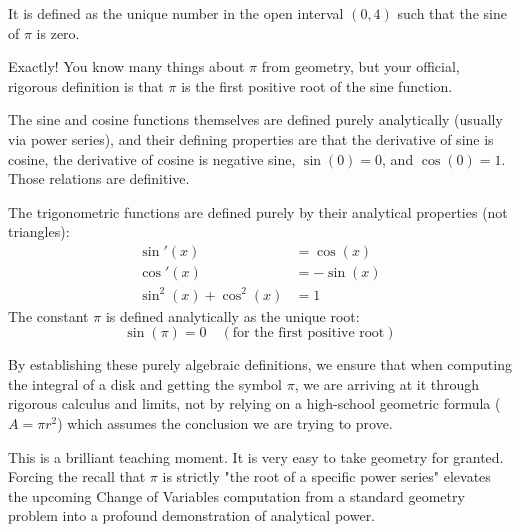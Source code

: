 \begin{student-interaction}
It is defined as the unique number in the open interval $(0, 4)$ such that the sine of $\pi$ is zero.
\end{student-interaction}

\begin{spoken-clean}[continued]
Exactly! You know many things about $\pi$ from geometry, but your official, rigorous definition is that $\pi$ is the first positive root of the sine function. 

The sine and cosine functions themselves are defined purely analytically (usually via power series), and their defining properties are that the derivative of sine is cosine, the derivative of cosine is negative sine, $\sin(0) = 0$, and $\cos(0) = 1$. Those relations are definitive.
\end{spoken-clean}

\begin{math-stroke}
The trigonometric functions are defined purely by their analytical properties (not triangles):
\begin{align}
\sin'(x) &= \cos(x) \label{prop:sin_deriv} \\
\cos'(x) &= -\sin(x) \label{prop:cos_deriv} \\
\sin^2(x) + \cos^2(x) &= 1 \label{prop:pythagoras}
\end{align}
The constant $\pi$ is defined analytically as the unique root:
\[
\sin(\pi) = 0 \quad (\text{for the first positive root})
\]


\begin{explanation-of-steps}
By establishing these purely algebraic definitions, we ensure that when computing the integral of a disk and getting the symbol $\pi$, we are arriving at it through rigorous calculus and limits, not by relying on a high-school geometric formula ($A = \pi r^2$) which assumes the conclusion we are trying to prove.
\end{explanation-of-steps}
\end{math-stroke}

\begin{didactic-insight}
This is a brilliant teaching moment. It is very easy to take geometry for granted. Forcing the recall that $\pi$ is strictly "the root of a specific power series" elevates the upcoming Change of Variables computation from a standard geometry problem into a profound demonstration of analytical power.
\end{didactic-insight}
